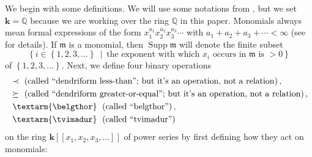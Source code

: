 \documentclass[numbers=enddot,12pt,final,onecolumn,notitlepage]{scrartcl}%
\theoremstyle{definition}
\newcommand{\tvi}{\left. \textarm{\tvimadur} \right.}
\newcommand{\bel}{\left. \textarm{\belgthor} \right.}
\begin{document}
We begin with some definitions. We will use some notations from \cite{dimcr},
but we set $\mathbf{k}=\mathbb{Q}$ because we are working over the ring
$\mathbb{Q}$ in this paper. Monomials always mean formal expressions of the
form $x_{1}^{a_{1}}x_{2}^{a_{2}}x_{3}^{a_{3}}\cdots$ with $a_{1}+a_{2}%
+a_{3}+\cdots<\infty$ (see \cite[Section 2]{dimcr} for details). If
$\mathfrak{m}$ is a monomial, then $\operatorname*{Supp}\mathfrak{m}$ will
denote the finite subset
\[
\left\{  i\in\left\{  1,2,3,\ldots\right\}  \ \mid\ \text{the exponent with
which }x_{i}\text{ occurs in }\mathfrak{m}\text{ is }>0\right\}
\]
of $\left\{  1,2,3,\ldots\right\}  $. Next, we define four binary operations
\begin{align*}
&  \left.  \prec\right.  \ \left(  \text{called \textquotedblleft dendriform
less-than\textquotedblright; but it's an operation, not a relation}\right)
,\\
&  \left.  \succeq\right.  \ \left(  \text{called \textquotedblleft dendriform
greater-or-equal\textquotedblright; but it's an operation, not a
relation}\right)  ,\\
&  \bel\ \left(  \text{called \textquotedblleft belgthor\textquotedblright%
}\right)  ,\\
&  \tvi\ \left(  \text{called \textquotedblleft tvimadur\textquotedblright%
}\right)
\end{align*}
on the ring $\mathbf{k}\left[  \left[  x_{1},x_{2},x_{3},\ldots\right]
\right]  $ of power series by first defining how they act on monomials:%
\end{document}

